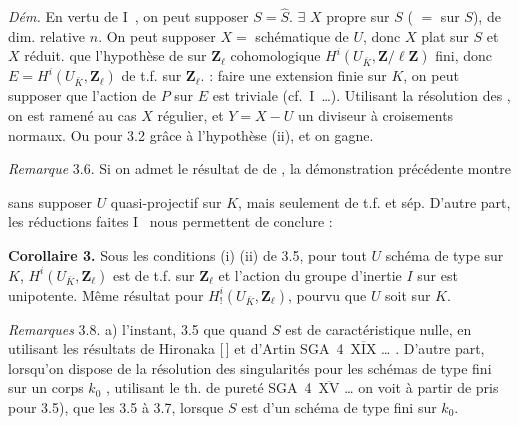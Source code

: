 \documentclass[11pt,a4paper]{article}
\begin{document}
\emph{Dém.} En vertu de I~\ill{}, on peut supposer $S = \hat S$.   \struck{\ill{} \ill{}} $\exists$ $X$  propre sur $S$ (\add{\uncertain{\ill{}}} $=$  sur $S$),  \struck{\ill{}} de dim. relative $n$. On peut supposer $X = $  schématique de $U$, donc $X$ plat sur $S$ et $X$ réduit.   que l'hypothèse de  \struck{\ill{}} sur $\mathbf{Z}_\ell$ cohomologique \ill{} $H^i(U_{\bar K}, \mathbf{Z}/\ell\mathbf{Z})$ fini, donc $E = H^i(U_{\bar K}, \mathbf{Z}_\ell)$ de t.f. sur $\mathbf{Z}_\ell$.  : faire une extension finie  sur $K$, on peut supposer que l'action de $P$ sur $E$ est triviale (cf.~I~…). Utilisant la résolution des ,  on est ramené au cas $X$ régulier, et $Y = X - U$ un diviseur à croisements normaux. Ou pour  3.2 grâce à l'hypothèse (ii), et on gagne.

\emph{Remarque} 3.6. Si on admet le résultat de \uncertain{\ill{}}  de , la démonstration précédente montre


sans supposer $U$ quasi-projectif sur $K$, mais seulement de t.f. et sép. D'autre part, les réductions faites    I~\ill{} nous permettent de conclure :

\textbf{Corollaire 3.} Sous les conditions (i) (ii) de 3.5, pour tout $U$ schéma de type  sur $K$, $H^i(U_{\bar K}, \mathbf{Z}_\ell)$ est de t.f. sur $\mathbf{Z}_\ell$ et l'action du groupe d'inertie $I$ sur \struck{\ill{}}  est  unipotente. Même résultat pour $H^i_!(U_{\bar K}, \mathbf{Z}_\ell)$, pourvu que $U$ soit \struck{\ill{}}  sur $K$.

\emph{Remarques} 3.8. \struck{\ill{}} a)  l'instant, 3.5      que \struck{\ill{} 3.2 \ill{}} quand $S$ est de caractéristique nulle, en utilisant les résultats de Hironaka [\,] et d'Artin SGA~4~$\overline{\text{XIX}}$ … . D'autre part, lorsqu'on dispose de la résolution des singularités  pour les schémas de type fini sur \struck{\ill{} \ill{}}  un corps $k_0$ \add{\uncertain{\ill{} \ill{}}}, utilisant le th. de pureté SGA~4~$\overline{\text{XV}}$ … on voit   \add{\uncertain{\ill{}}}  à partir de  pris  pour 3.5), que les  \ill{} \ill{} \ill{} \ill{} \ill{} \ill{} \ill{} 3.5 à 3.7, lorsque $S$ est \struck{\ill{}} \add{\uncertain{\ill{}}} \struck{\ill{}}  d'un schéma de type fini sur \struck{\ill{}} $k_0$.
\end{document}
